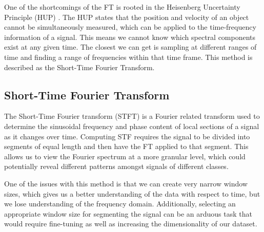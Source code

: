 \documentclass{turabian-thesis}
\begin{document}
One of the shortcomings of the FT is rooted in the Heisenberg Uncertainty Principle (HUP) \cite{hill_uncertainty_nodate}.  The HUP states that the position and velocity of an object cannot be simultaneously measured, which can be applied to the time-frequency information of a signal. This means we cannot know which spectral components exist at any given time. The closest we can get is sampling at different ranges of time and finding a range of frequencies within that time frame. This method is described as the Short-Time Fourier Transform.






\subsection{Short-Time Fourier Transform}
The Short-Time Fourier transform (STFT) is a Fourier related transform used to determine the sinusoidal frequency and phase content of local sections of a signal as it changes over time. \cite{hill_uncertainty_nodate}
Computing STF requires the signal to be divided into segments of equal length and then have the FT applied to that segment. This allows us to view the Fourier spectrum at a more granular level, which could potentially reveal different patterns amongst signals of different classes.

One of the issues with this method is that we can create very narrow window sizes, which gives us a better understanding of the data with respect to time, but we lose understanding of the frequency domain. Additionally, selecting an appropriate window size for segmenting the signal can be an arduous task that would require fine-tuning as well as increasing the dimensionality of our dataset.
\end{document}
